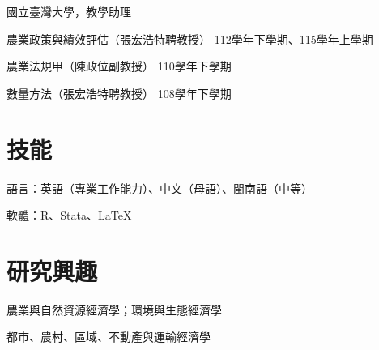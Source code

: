 \documentclass[11pt,letterpaper]{article}
\begin{document}
國立臺灣大學，教學助理

農業政策與績效評估（張宏浩特聘教授）
\hfill \mbox{112學年下學期、115學年上學期}

農業法規甲（陳政位副教授） \hfill \mbox{110學年下學期}

數量方法（張宏浩特聘教授） \hfill \mbox{108學年下學期}

\section{技能}\label{ux6280ux80fd}

語言：英語（專業工作能力）、中文（母語）、閩南語（中等）

軟體：R、Stata、\LaTeX

\section{研究興趣}\label{ux7814ux7a76ux8208ux8da3}

農業與自然資源經濟學；環境與生態經濟學

都市、農村、區域、不動產與運輸經濟學
\end{document}
